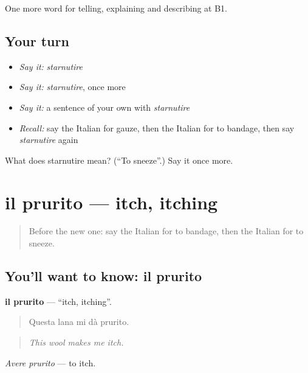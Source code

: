 \begin{grammarlens}[title={What you've built}]
One more word for telling, explaining and describing at B1.
\end{grammarlens}

\subsection*{Your turn}
\begin{itemize}
\raggedright
  \item \emph{Say it:} \emph{starnutire}
  \item \emph{Say it:} \emph{starnutire}, once more
  \item \emph{Say it:} a sentence of your own with \emph{starnutire}
  \item \emph{Recall:} say the Italian for gauze, then the Italian for to bandage, then say \emph{starnutire} again
\end{itemize}

\begin{tcolorbox}[breakable,colback=teal!4,colframe=teal!35!black,title={Before you move on}]
What does starnutire mean? (\textquotedblleft{}To sneeze\textquotedblright{}.) Say it once more.
\end{tcolorbox}
\section[il prurito]{il prurito — itch, itching}

\label{lesson:IT-C486-prurito}



\begin{quote}
Before the new one: say the Italian for to bandage, then the Italian for to sneeze.
\end{quote}

\subsection*{You'll want to know: il prurito}
\textbf{il prurito} — \textquotedblleft{}itch, itching\textquotedblright{}.

\begin{quote}
Questa lana mi dà prurito.
\end{quote}

\begin{quote}
\emph{This wool makes me itch.}
\end{quote}

\emph{Avere prurito} — to itch.

